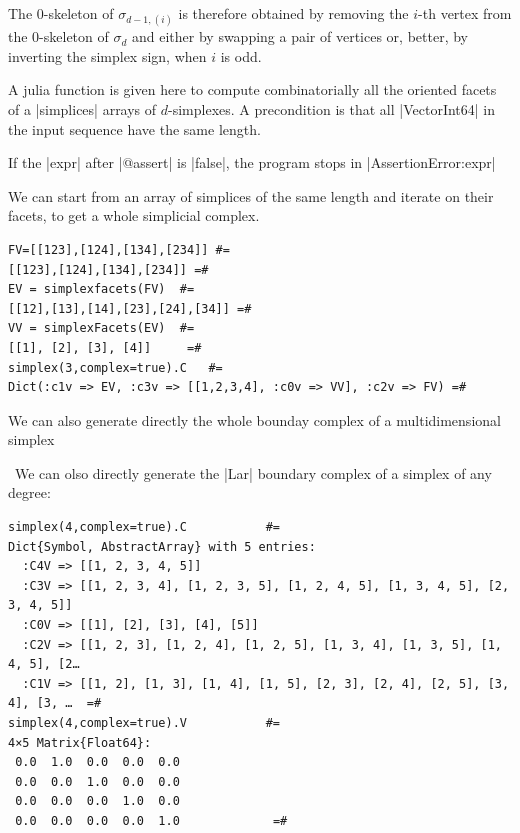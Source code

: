The $0$-skeleton of $\sigma_{d-1,(i)}$ is therefore obtained by removing the 
$i$-th vertex from the $0$-skeleton of $\sigma_{d}$ and either by swapping 
a pair of vertices or, better, by inverting the simplex sign, when $i$ 
is odd.  


\begin{coding} A julia function is given here to compute combinatorially all the oriented facets of a |simplices| arrays of $d$-simplexes. A precondition is that all |Vector{Int64}| in the input sequence have the same length.

If the |expr| after |@assert| is |false|, the program stops in |AssertionError:expr| 
\end{coding}

\begin{coding} We can start from an array of simplices of the same length and iterate on their facets, to get a whole simplicial complex.
\begin{lstlisting}[language=JuliaLocal, style=julia, mathescape = true]
FV=[[123],[124],[134],[234]] #=
[[123],[124],[134],[234]] =#
EV = simplexfacets(FV)  #=
[[12],[13],[14],[23],[24],[34]] =#
VV = simplexFacets(EV)  #=
[[1], [2], [3], [4]]     =#
simplex(3,complex=true).C   #=
Dict(:c1v => EV, :c3v => [[1,2,3,4], :c0v => VV], :c2v => FV) =#
\end{lstlisting}
\end{coding}
We can also generate directly the whole bounday complex of a multidimensional simplex

\begin{coding}\ 
We can olso directly generate the |Lar| boundary complex of a simplex of any degree:
\begin{lstlisting}[language=JuliaLocal, style=julia, mathescape = true]
simplex(4,complex=true).C			#=
Dict{Symbol, AbstractArray} with 5 entries:
  :C4V => [[1, 2, 3, 4, 5]]
  :C3V => [[1, 2, 3, 4], [1, 2, 3, 5], [1, 2, 4, 5], [1, 3, 4, 5], [2, 3, 4, 5]]
  :C0V => [[1], [2], [3], [4], [5]]
  :C2V => [[1, 2, 3], [1, 2, 4], [1, 2, 5], [1, 3, 4], [1, 3, 5], [1, 4, 5], [2…
  :C1V => [[1, 2], [1, 3], [1, 4], [1, 5], [2, 3], [2, 4], [2, 5], [3, 4], [3, …  =#
simplex(4,complex=true).V			#=
4×5 Matrix{Float64}:
 0.0  1.0  0.0  0.0  0.0
 0.0  0.0  1.0  0.0  0.0
 0.0  0.0  0.0  1.0  0.0
 0.0  0.0  0.0  0.0  1.0			 =#
\end{lstlisting}
\end{coding}


